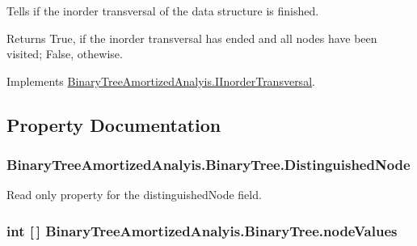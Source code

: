 Tells if the inorder transversal of the data structure is finished. 

\begin{DoxyReturn}{Returns}
True, if the inorder transversal has ended and all nodes have been visited; False, othewise.
\end{DoxyReturn}


Implements \hyperlink{interface_binary_tree_amortized_analyis_1_1_i_inorder_transversal_a8a169c9c426b9f37613f44e7997ae329}{Binary\+Tree\+Amortized\+Analyis.\+I\+Inorder\+Transversal}.



\subsection{Property Documentation}
\subsubsection[{\texorpdfstring{Distinguished\+Node}{DistinguishedNode}}]{ Binary\+Tree\+Amortized\+Analyis.\+Binary\+Tree.\+Distinguished\+Node\hspace{0.3cm}{\ttfamily [get]}}\hypertarget{class_binary_tree_amortized_analyis_1_1_binary_tree_ab1598c045051cc8cf5b9696dbd8a8ee9}{}\label{class_binary_tree_amortized_analyis_1_1_binary_tree_ab1598c045051cc8cf5b9696dbd8a8ee9}


Read only property for the distinguished\+Node field. 

\subsubsection[{\texorpdfstring{node\+Values}{nodeValues}}]{\setlength{\rightskip}{0pt plus 5cm}int \mbox{[}$\,$\mbox{]} Binary\+Tree\+Amortized\+Analyis.\+Binary\+Tree.\+node\+Values\hspace{0.3cm}{\ttfamily [get]}}\hypertarget{class_binary_tree_amortized_analyis_1_1_binary_tree_a6c23184f17d0c484533e8526b29488e3}{}\label{class_binary_tree_amortized_analyis_1_1_binary_tree_a6c23184f17d0c484533e8526b29488e3}


